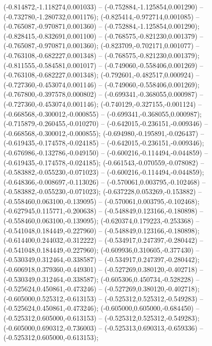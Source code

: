  (-0.814872,-1.118274,0.001033) -- (-0.752884,-1.125854,0.001290) -- (-0.732780,-1.280732,0.001176);
 (-0.825414,-0.972714,0.001085) -- (-0.765087,-0.970871,0.001360) -- (-0.752884,-1.125854,0.001290);
 (-0.828415,-0.832691,0.001100) -- (-0.768575,-0.821230,0.001379) -- (-0.765087,-0.970871,0.001360);
 (-0.823709,-0.702171,0.001077) -- (-0.763108,-0.682227,0.001348) -- (-0.768575,-0.821230,0.001379);
 (-0.811555,-0.584581,0.001017) -- (-0.749060,-0.558406,0.001269) -- (-0.763108,-0.682227,0.001348);
 (-0.792601,-0.482517,0.000924) -- (-0.727360,-0.453074,0.001146) -- (-0.749060,-0.558406,0.001269);
 (-0.767800,-0.397578,0.000802) -- (-0.699341,-0.368055,0.000987) -- (-0.727360,-0.453074,0.001146);
 (-0.740129,-0.327155,-0.001124) -- (-0.668568,-0.300012,-0.000855) -- (-0.699341,-0.368055,0.000987);
 (-0.715879,-0.260455,-0.010270) -- (-0.642015,-0.236151,-0.009346) -- (-0.668568,-0.300012,-0.000855);
 (-0.694980,-0.195891,-0.026437) -- (-0.619435,-0.174578,-0.024185) -- (-0.642015,-0.236151,-0.009346);
 (-0.676986,-0.132786,-0.049150) -- (-0.600216,-0.114494,-0.044859) -- (-0.619435,-0.174578,-0.024185);
 (-0.661543,-0.070559,-0.078082) -- (-0.583882,-0.055230,-0.071023) -- (-0.600216,-0.114494,-0.044859);
 (-0.648366,-0.008697,-0.113026) -- (-0.570061,0.003795,-0.102468) -- (-0.583882,-0.055230,-0.071023);
 (-0.637228,0.053269,-0.153882) -- (-0.558460,0.063100,-0.139095) -- (-0.570061,0.003795,-0.102468);
 (-0.627945,0.115771,-0.200638) -- (-0.548849,0.123166,-0.180898) -- (-0.558460,0.063100,-0.139095);
 (-0.620374,0.179223,-0.253368) -- (-0.541048,0.184449,-0.227960) -- (-0.548849,0.123166,-0.180898);
 (-0.614400,0.244032,-0.312222) -- (-0.534917,0.247397,-0.280442) -- (-0.541048,0.184449,-0.227960);
 (-0.609936,0.310605,-0.377430) -- (-0.530349,0.312464,-0.338587) -- (-0.534917,0.247397,-0.280442);
 (-0.606918,0.379360,-0.449301) -- (-0.527269,0.380120,-0.402718) -- (-0.530349,0.312464,-0.338587);
 (-0.605306,0.450734,-0.528228) -- (-0.525624,0.450861,-0.473246) -- (-0.527269,0.380120,-0.402718);
 (-0.605000,0.525312,-0.613153) -- (-0.525312,0.525312,-0.549283) -- (-0.525624,0.450861,-0.473246);
 (-0.605000,0.605000,-0.684450) -- (-0.525312,0.605000,-0.613153) -- (-0.525312,0.525312,-0.549283);
 (-0.605000,0.690312,-0.736003) -- (-0.525313,0.690313,-0.659336) -- (-0.525312,0.605000,-0.613153);
